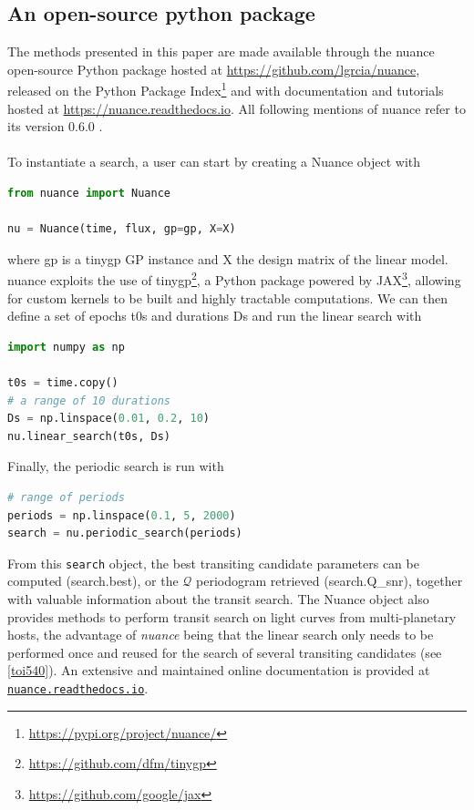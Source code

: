 \documentclass[modern,linenumbers]{aastex631}
\newcommand{\nuancemethod}{\textit{nuance}}
\newcommand{\nuancecode}{\textsf{nuance}}
\newcommand{\review}[1]{#1}
\newcommand{\footlink}[1]{\footnote{\url{#1}}}
\begin{document}
\subsection{An open-source python package}\label{package}
The methods presented in this paper are made available through the \nuancecode{} open-source Python package hosted at \href{https://github.com/lgrcia/nuance}{https://github.com/lgrcia/nuance}, released on the Python Package Index\footlink{https://pypi.org/project/nuance/} and with documentation and tutorials hosted at \href{https://nuance.readthedocs.io}{https://nuance.readthedocs.io}. All following mentions of \nuancecode{} refer to its \review{version 0.6.0 \citep{zenodo}.}{} \\\\
To instantiate a search, a user can start by creating a \textsf{Nuance} object with
\begin{lstlisting}[language=Python]
from nuance import Nuance

nu = Nuance(time, flux, gp=gp, X=X)
\end{lstlisting}
where \textsf{gp} is a \textsf{tinygp} GP instance and \textsf{X} the design matrix of the linear model. \textsf{nuance} exploits the use of \textsf{tinygp}\footnote{\href{https://github.com/dfm/tinygp}{https://github.com/dfm/tinygp}}, a Python package powered by \textsf{JAX}\footnote{\href{https://github.com/google/jax}{https://github.com/google/jax}}, allowing for custom kernels to be built and highly tractable computations. We can then define a set of epochs \textsf{t0s} and durations \textsf{Ds} and run the linear search with
\begin{lstlisting}[language=Python,linewidth=\linewidth]
import numpy as np

t0s = time.copy()
# a range of 10 durations
Ds = np.linspace(0.01, 0.2, 10)
nu.linear_search(t0s, Ds)
\end{lstlisting}
Finally, the periodic search is run with
\begin{lstlisting}[language=Python]
# range of periods
periods = np.linspace(0.1, 5, 2000)
search = nu.periodic_search(periods)
\end{lstlisting}
From this \texttt{search} object, the best transiting candidate parameters can be computed (\textsf{search.best}), or the $\mathcal{Q}$ periodogram retrieved (\textsf{search.Q\_snr}), together with valuable information about the transit search. The \textsf{Nuance} object also provides methods to perform transit search on light curves from multi-planetary hosts, the advantage of \nuancemethod{} being that the linear search only needs to be performed once and reused for the search of several transiting candidates (see \autoref{toi540}). An extensive and maintained online documentation is provided at \href{https://nuance.readthedocs.io}{\texttt{nuance.readthedocs.io}}.
\end{document}
